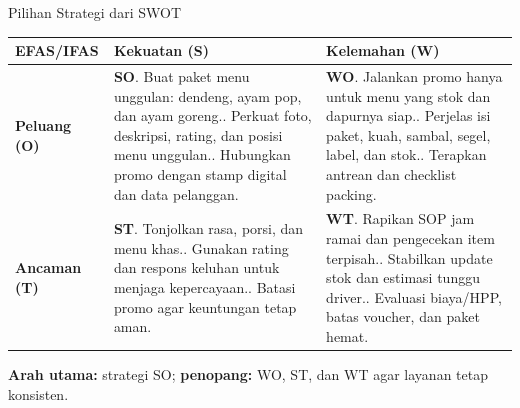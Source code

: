\documentclass[aspectratio=169,11pt]{beamer}
\newcommand{\strong}[1]{\textbf{\textcolor{usuGreen!85!black}{#1}}}
\begin{document}
\begin{frame}{Pilihan Strategi dari SWOT}
\scriptsize
\begin{tabularx}{\textwidth}{@{}L{0.23\textwidth}Y Y@{}}
\toprule
\textbf{EFAS/IFAS} & \textbf{Kekuatan (S)} & \textbf{Kelemahan (W)} \\
\midrule
\textbf{Peluang (O)} &
\textbf{SO}. Buat paket menu unggulan: dendeng, ayam pop, dan ayam goreng.. Perkuat foto, deskripsi, rating, dan posisi menu unggulan.. Hubungkan promo dengan stamp digital dan data pelanggan. &
\textbf{WO}. Jalankan promo hanya untuk menu yang stok dan dapurnya siap.. Perjelas isi paket, kuah, sambal, segel, label, dan stok.. Terapkan antrean dan checklist packing. \\
\addlinespace[0.15cm]
\textbf{Ancaman (T)} &
\textbf{ST}. Tonjolkan rasa, porsi, dan menu khas.. Gunakan rating dan respons keluhan untuk menjaga kepercayaan.. Batasi promo agar keuntungan tetap aman. &
\textbf{WT}. Rapikan SOP jam ramai dan pengecekan item terpisah.. Stabilkan update stok dan estimasi tunggu driver.. Evaluasi biaya/HPP, batas voucher, dan paket hemat. \\
\bottomrule
\end{tabularx}
\vspace{0.2cm}
\begin{center}
\strong{Arah utama:} strategi SO; \strong{penopang:} WO, ST, dan WT agar layanan tetap konsisten.
\end{center}
\end{frame}
\end{document}
